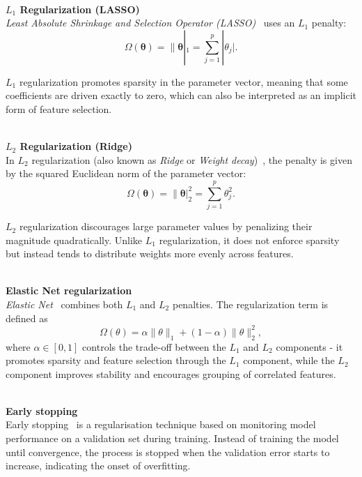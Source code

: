 \textbf{\\$L_1$ Regularization (LASSO)\\}
\emph{Least Absolute Shrinkage and Selection Operator (LASSO)}~\cite{tibshirani1996} uses an $L_1$ penalty:
\begin{equation*}
    \Omega(\boldsymbol{\theta}) = \|\boldsymbol{\theta}|_1 = \sum_{j=1}^{p} |\theta_j|.
\end{equation*}

$L_1$ regularization promotes sparsity in the parameter vector, meaning that some coefficients are driven exactly to zero, which can also be interpreted as an implicit form of feature selection.

\textbf{\\$L_2$ Regularization (Ridge)\\}
In $L_2$ regularization (also known as \emph{Ridge} or \emph{Weight decay})~\cite{hoerl1970}, the penalty is given by the squared Euclidean norm of the parameter vector:
\begin{equation*}
    \Omega(\boldsymbol{\theta}) = \|\boldsymbol{\theta}|_2^2 = \sum_{j=1}^{p} \theta_j^2.
\end{equation*}

$L_2$ regularization discourages large parameter values by penalizing their magnitude quadratically. Unlike $L_1$ regularization, it does not enforce sparsity but instead tends to distribute weights more evenly across features.

\textbf{\\Elastic Net regularization\\}
\emph{Elastic Net}~\cite{zou2005} combines both $L_1$ and $L_2$ penalties. The regularization term is defined as
\begin{equation*}
    \Omega(\theta) = \alpha \|\theta\|_1 + (1 - \alpha)\|\theta\|_2^2,
\end{equation*}
where $\alpha \in [0,1]$ controls the trade-off between the $L_1$ and $L_2$ components - it promotes sparsity and feature selection through the $L_1$ component, while the $L_2$ component improves stability and encourages grouping of correlated features.

\textbf{\\Early stopping\\}
Early stopping~\cite{aggarwal2018} is a regularisation technique based on monitoring model performance on a validation set during training. Instead of training the model until convergence, the process is stopped when the validation error starts to increase, indicating the onset of overfitting.

